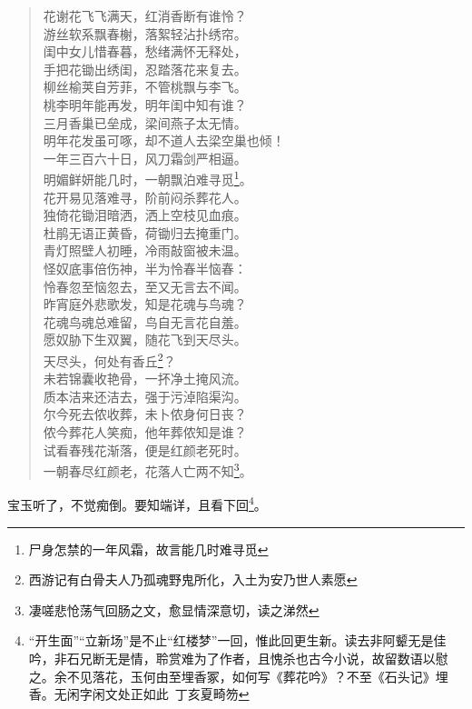\documentclass[12pt,oneside]{book}
\newenvironment{shici}{%
\begin{verse}%
\centering\large\hspace{12pt}}%
{\end{verse}}
\begin{document}
\begin{shici}
花谢花飞飞满天，红消香断有谁怜？\\
游丝软系飘春榭，落絮轻沾扑绣帘。\\
闺中女儿惜春暮，愁绪满怀无释处，\\
手把花锄出绣闺，忍踏落花来复去。\\
柳丝榆荚自芳菲，不管桃飘与李飞。\\
桃李明年能再发，明年闺中知有谁？\\
三月香巢已垒成，梁间燕子太无情。\\
明年花发虽可啄，却不道人去梁空巢也倾！\\
一年三百六十日，风刀霜剑严相逼。\\
明媚鲜妍能几时，一朝飘泊难寻觅\footnote{尸身怎禁的一年风霜，故言能几时难寻觅}。\\
花开易见落难寻，阶前闷杀葬花人。\\
独倚花锄泪暗洒，洒上空枝见血痕。\\
杜鹃无语正黄昏，荷锄归去掩重门。\\
青灯照壁人初睡，冷雨敲窗被未温。\\
怪奴底事倍伤神，半为怜春半恼春：\\
怜春忽至恼忽去，至又无言去不闻。\\
昨宵庭外悲歌发，知是花魂与鸟魂？\\
花魂鸟魂总难留，鸟自无言花自羞。\\
愿奴胁下生双翼，随花飞到天尽头。\\
天尽头，何处有香丘\footnote{西游记有白骨夫人乃孤魂野鬼所化，入土为安乃世人素愿}？\\
未若锦囊收艳骨，一抔净土掩风流。\\
质本洁来还洁去，强于污淖陷渠沟。\\
尔今死去侬收葬，未卜侬身何日丧？\\
侬今葬花人笑痴，他年葬侬知是谁？\\
试看春残花渐落，便是红颜老死时。\\
一朝春尽红颜老，花落人亡两不知\footnote{凄嗟悲怆荡气回肠之文，愈显情深意切，读之涕然}。
\end{shici}


宝玉听了，不觉痴倒。要知端详，且看下回\footnote{“开生面”“立新场”是不止“红楼梦”一回，惟此回更生新。读去非阿颦无是佳吟，非石兄断无是情，聆赏难为了作者，且愧杀也古今小说，故留数语以慰之。余不见落花，玉何由至埋香冢，如何写《葬花吟》？不至《石头记》埋香。无闲字闲文处正如此~丁亥夏畸笏}。

 
\end{document}
